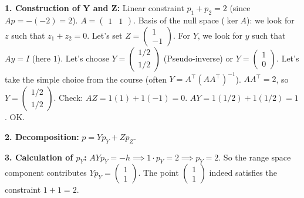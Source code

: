 \begin{correction}
\textbf{1. Construction of Y and Z:}
Linear constraint $p_1 + p_2 = 2$ (since $Ap = -(-2) = 2$).
$A = \begin{pmatrix} 1 & 1 \end{pmatrix}$. Basis of the null space ($\ker A$): we look for $z$ such that $z_1 + z_2 = 0$.
Let's set $Z = \begin{pmatrix} 1 \\ -1 \end{pmatrix}$.
For $Y$, we look for $y$ such that $Ay = I$ (here $1$). Let's choose $Y = \begin{pmatrix} 1/2 \\ 1/2 \end{pmatrix}$ (Pseudo-inverse) or $Y = \begin{pmatrix} 1 \\ 0 \end{pmatrix}$.
Let's take the simple choice from the course (often $Y = A^\top (AA^\top)^{-1}$). $AA^\top = 2$, so $Y = \begin{pmatrix} 1/2 \\ 1/2 \end{pmatrix}$.
Check: $A Z = 1(1) + 1(-1) = 0$. $A Y = 1(1/2) + 1(1/2) = 1$. OK.

\textbf{2. Decomposition:} $p = Y p_Y + Z p_Z$.

\textbf{3. Calculation of $p_Y$:}
$AY p_Y = -h \implies 1 \cdot p_Y = 2 \implies p_Y = 2$.
So the range space component contributes $Y p_Y = \begin{pmatrix} 1 \\ 1 \end{pmatrix}$.
The point $\begin{pmatrix} 1 \\ 1 \end{pmatrix}$ indeed satisfies the constraint $1+1=2$.


\end{correction}
